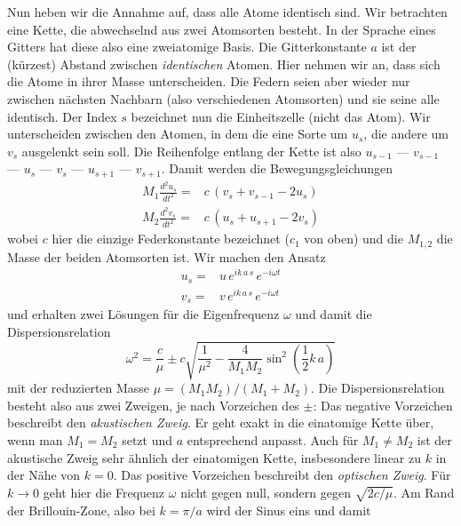 Nun heben wir die Annahme auf, dass alle Atome identisch sind. Wir betrachten eine Kette, die abwechselnd aus zwei Atomsorten besteht. In der Sprache eines Gitters hat diese also eine zweiatomige Basis. Die Gitterkonstante $a$ ist der (kürzest) Abstand zwischen \emph{identischen} Atomen. Hier nehmen wir an, dass sich die Atome in ihrer Masse unterscheiden. Die Federn seien aber wieder nur zwischen nächsten Nachbarn (also verschiedenen Atomsorten) und sie seine alle identisch. Der Index $s$ bezeichnet nun die Einheitszelle (nicht das Atom). Wir unterscheiden zwischen den Atomen, in dem die eine Sorte um $u_s$, die andere um $v_s$ ausgelenkt sein soll.  Die Reihenfolge entlang der Kette ist also $u_{s-1}$ ---  $v_{s-1}$ --- $u_{s}$ ---  $v_{s}$ --- $u_{s+1}$ ---  $v_{s+1}$. Damit werden die Bewegungsgleichungen
\begin{align}
 M_1 \frac{d^2 u_s}{dt^2} = & c \, \left( v_s + v_{s-1} - 2 u_s \right) \\
 M_2 \frac{d^2 v_s}{dt^2} = & c \, \left( u_s + u_{s+1} - 2 v_s \right) 
\end{align}
wobei $c$ hier die einzige Federkonstante bezeichnet ($c_1$ von oben) und die $M_{1,2}$ die Masse der beiden Atomsorten ist.
Wir machen den Ansatz
\begin{align}
  u_s   = & u \,   e^{i  k \, a \,  s} \, e^{-i \omega t} \\
  v_s  = & v  \, e^{i  k \, a \,  s} \, e^{-i \omega t}
\end{align}
und erhalten zwei Lösungen für die Eigenfrequenz $\omega$ und damit die Dispersionsrelation
\begin{equation}
\omega^2 =  \frac{c}{\mu}
\pm c \sqrt{ \frac{1}{\mu^2} - \frac{4}{M_1 M_2}  \sin^2 \left( \frac{1}{2}   k \, a  \right) }  \label{eq:phonon_2atom}
\end{equation}
mit der reduzierten Masse $\mu = (M_1  M_2)/(M_1 + M_2)$. Die Dispersionsrelation besteht also aus zwei Zweigen, je nach Vorzeichen des $\pm$: Das negative Vorzeichen beschreibt den \emph{akustischen Zweig}. Er geht exakt in die einatomige Kette über, wenn man $M_1 = M_2$ setzt und $a$ entsprechend anpasst. Auch für $M_1 \neq M_2$ ist der akustische Zweig sehr ähnlich der einatomigen Kette, insbesondere linear zu $k$ in der Nähe von $k=0$. Das positive Vorzeichen beschreibt den \emph{optischen Zweig}. Für $k \rightarrow 0$ geht hier die Frequenz $\omega$ nicht gegen null, sondern gegen $\sqrt{2 c / \mu}$. Am Rand der Brillouin-Zone, also bei $k = \pi /a $ wird der Sinus eins und damit
